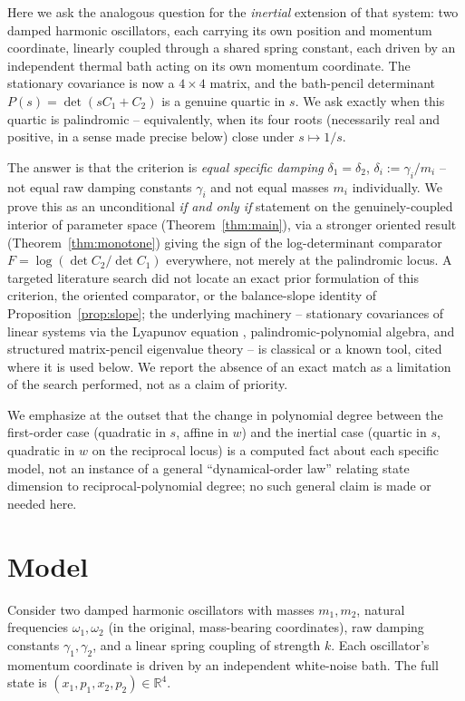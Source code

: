 \documentclass[11pt]{article}
\theoremstyle{definition}
\newcommand{\R}{\mathbb{R}}
\begin{document}
Here we ask the analogous question for the \emph{inertial} extension of
that system: two damped harmonic oscillators, each carrying its own
position and momentum coordinate, linearly coupled through a shared
spring constant, each driven by an independent thermal bath acting on its
own momentum coordinate. The stationary covariance is now a $4\times4$
matrix, and the bath-pencil determinant $P(s)=\det(sC_1+C_2)$ is a genuine
quartic in $s$. We ask exactly when this quartic is palindromic --
equivalently, when its four roots (necessarily real and positive, in a
sense made precise below) close under $s\mapsto1/s$.

The answer is that the criterion is \emph{equal specific damping}
$\delta_1=\delta_2$, $\delta_i:=\gamma_i/m_i$ -- not equal raw damping
constants $\gamma_i$ and not equal masses $m_i$ individually. We prove
this as an unconditional \emph{if and only if} statement on the
genuinely-coupled interior of parameter space (Theorem~\ref{thm:main}),
via a stronger oriented result (Theorem~\ref{thm:monotone}) giving the
sign of the log-determinant comparator $F=\log(\det C_2/\det C_1)$
everywhere, not merely at the palindromic locus. A targeted literature
search did not locate an exact prior formulation of this criterion, the
oriented comparator, or the balance-slope identity of
Proposition~\ref{prop:slope}; the underlying machinery -- stationary
covariances of linear systems via the Lyapunov equation
\cite{kailath1980}, palindromic-polynomial algebra, and structured
matrix-pencil eigenvalue theory \cite{mackey2006} -- is classical or a
known tool, cited where it is used below. We report the absence of an
exact match as a limitation of the search performed, not as a claim of
priority.

We emphasize at the outset that the change in polynomial degree between
the first-order case (quadratic in $s$, affine in $w$) and the inertial
case (quartic in $s$, quadratic in $w$ on the reciprocal locus) is a
computed fact about each specific model, not an instance of a general
``dynamical-order law'' relating state dimension to reciprocal-polynomial
degree; no such general claim is made or needed here.

\section{Model}
\label{sec:model}

Consider two damped harmonic oscillators with masses $m_1,m_2$, natural
frequencies $\omega_1,\omega_2$ (in the original, mass-bearing
coordinates), raw damping constants $\gamma_1,\gamma_2$, and a linear
spring coupling of strength $k$. Each oscillator's momentum coordinate is
driven by an independent white-noise bath. The full state is
$(x_1,p_1,x_2,p_2)\in\R^4$.
\end{document}
